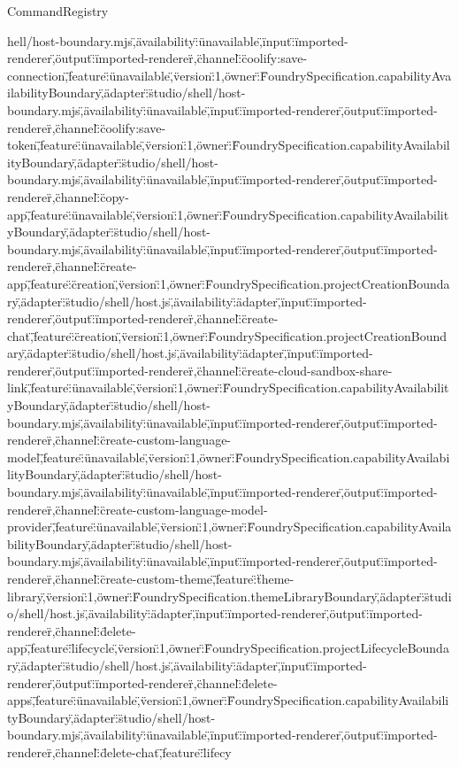 \begin{lexlean}{CommandRegistry}
\begin{semanticmodule}
{hell/host-boundary.mjs\",\"availability\":\"unavailable\",\"input\":\"imported-renderer\",\"output\":\"imported-renderer\"},{\"channel\":\"coolify:save-connection\",\"feature\":\"unavailable\",\"version\":1,\"owner\":\"FoundrySpecification.capabilityAvailabilityBoundary\",\"adapter\":\"studio/shell/host-boundary.mjs\",\"availability\":\"unavailable\",\"input\":\"imported-renderer\",\"output\":\"imported-renderer\"},{\"channel\":\"coolify:save-token\",\"feature\":\"unavailable\",\"version\":1,\"owner\":\"FoundrySpecification.capabilityAvailabilityBoundary\",\"adapter\":\"studio/shell/host-boundary.mjs\",\"availability\":\"unavailable\",\"input\":\"imported-renderer\",\"output\":\"imported-renderer\"},{\"channel\":\"copy-app\",\"feature\":\"unavailable\",\"version\":1,\"owner\":\"FoundrySpecification.capabilityAvailabilityBoundary\",\"adapter\":\"studio/shell/host-boundary.mjs\",\"availability\":\"unavailable\",\"input\":\"imported-renderer\",\"output\":\"imported-renderer\"},{\"channel\":\"create-app\",\"feature\":\"creation\",\"version\":1,\"owner\":\"FoundrySpecification.projectCreationBoundary\",\"adapter\":\"studio/shell/host.js\",\"availability\":\"adapter\",\"input\":\"imported-renderer\",\"output\":\"imported-renderer\"},{\"channel\":\"create-chat\",\"feature\":\"creation\",\"version\":1,\"owner\":\"FoundrySpecification.projectCreationBoundary\",\"adapter\":\"studio/shell/host.js\",\"availability\":\"adapter\",\"input\":\"imported-renderer\",\"output\":\"imported-renderer\"},{\"channel\":\"create-cloud-sandbox-share-link\",\"feature\":\"unavailable\",\"version\":1,\"owner\":\"FoundrySpecification.capabilityAvailabilityBoundary\",\"adapter\":\"studio/shell/host-boundary.mjs\",\"availability\":\"unavailable\",\"input\":\"imported-renderer\",\"output\":\"imported-renderer\"},{\"channel\":\"create-custom-language-model\",\"feature\":\"unavailable\",\"version\":1,\"owner\":\"FoundrySpecification.capabilityAvailabilityBoundary\",\"adapter\":\"studio/shell/host-boundary.mjs\",\"availability\":\"unavailable\",\"input\":\"imported-renderer\",\"output\":\"imported-renderer\"},{\"channel\":\"create-custom-language-model-provider\",\"feature\":\"unavailable\",\"version\":1,\"owner\":\"FoundrySpecification.capabilityAvailabilityBoundary\",\"adapter\":\"studio/shell/host-boundary.mjs\",\"availability\":\"unavailable\",\"input\":\"imported-renderer\",\"output\":\"imported-renderer\"},{\"channel\":\"create-custom-theme\",\"feature\":\"theme-library\",\"version\":1,\"owner\":\"FoundrySpecification.themeLibraryBoundary\",\"adapter\":\"studio/shell/host.js\",\"availability\":\"adapter\",\"input\":\"imported-renderer\",\"output\":\"imported-renderer\"},{\"channel\":\"delete-app\",\"feature\":\"lifecycle\",\"version\":1,\"owner\":\"FoundrySpecification.projectLifecycleBoundary\",\"adapter\":\"studio/shell/host.js\",\"availability\":\"adapter\",\"input\":\"imported-renderer\",\"output\":\"imported-renderer\"},{\"channel\":\"delete-apps\",\"feature\":\"unavailable\",\"version\":1,\"owner\":\"FoundrySpecification.capabilityAvailabilityBoundary\",\"adapter\":\"studio/shell/host-boundary.mjs\",\"availability\":\"unavailable\",\"input\":\"imported-renderer\",\"output\":\"imported-renderer\"},{\"channel\":\"delete-chat\",\"feature\":\"lifecy}
\end{semanticmodule}
\end{lexlean}
